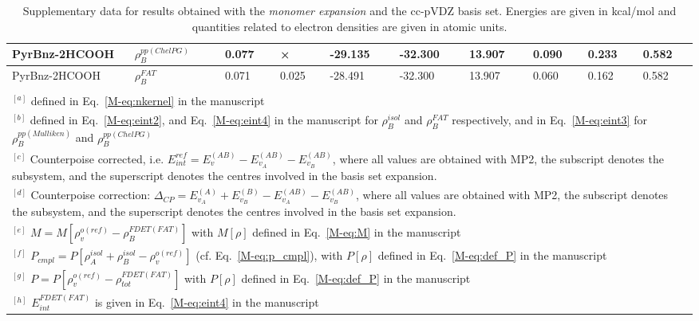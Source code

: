 \documentclass[amsmath,amssymb,preprint,aip,jcp]{revtex4-1}
\begin{document}
\begin{table}[H]
\begin{center}
{\begin{tabular}{|l|l|l|l|l|l|l|l|l|l|}
PyrBnz-2HCOOH & $\rho_B^{pp(ChelPG)}$ & 0.077 & × & -29.135 & -32.300 & 13.907 & 0.090 & 0.233 & 0.582\\\hline
PyrBnz-2HCOOH & $\rho_B^{FAT}$ & 0.071 & 0.025 & -28.491 & -32.300 & 13.907 & 0.060 & 0.162 & 0.582\\\hline
\multicolumn{10}{c}{ } \\
\multicolumn{10}{p{1.0\textwidth}}{$^{[a]}$ defined in Eq.~\ref{M-eq:nkernel} in the manuscript}\\
\multicolumn{10}{p{1.0\textwidth}}{$^{[b]}$ defined in Eq.~\ref{M-eq:eint2}, and Eq.~\ref{M-eq:eint4} in the manuscript for $\rho_B^{isol}$ and $\rho_B^{FAT }$ respectively, and in Eq.~\ref{M-eq:eint3} for $\rho_B^{pp(Mulliken)}$ and $\rho_B^{pp(ChelPG)}$}\\
\multicolumn{10}{p{1.0\textwidth}}{$^{[c]}$ Counterpoise corrected, i.e. $E_{int}^{ref} = E_{v}^{(AB)} - E_{v_A}^{(AB)} - E_{v_B}^{(AB)}$, where all values are obtained with MP2, the subscript denotes the subsystem, and the superscript denotes the centres involved in the basis set expansion.} \\
\multicolumn{10}{p{1.0\textwidth}}{$^{[d]}$ Counterpoise correction: $\Delta_{CP} = E_{v_A}^{(A)} + E_{v_B}^{(B)} - E_{v_A}^{(AB)} - E_{v_B}^{(AB)}$, where all values are obtained with MP2, the subscript denotes the subsystem, and the superscript denotes the centres involved in the basis set expansion.} \\
\multicolumn{10}{p{1.0\textwidth}}{$^{[e]}$ $M=M[\rho_v^{o(ref)} - \rho^{FDET(FAT)}_{B}]$ with $M[\rho]$ defined in Eq.~\ref{M-eq:M} in the manuscript}\\
\multicolumn{10}{p{1.0\textwidth}}{$^{[f]}$ $P_{cmpl}=P[\rho_A^{isol}+\rho_B^{isol} - \rho_v^{o(ref)}]$ (cf. Eq.~\ref{M-eq:p_cmpl}), with $P[\rho]$ defined in Eq.~\ref{M-eq:def_P} in the manuscript}\\
\multicolumn{10}{p{1.0\textwidth}}{$^{[g]}$ $P=P[\rho_v^{o(ref)} - \rho_{tot}^{FDET(FAT)}]$ with $P[\rho]$ defined in Eq.~\ref{M-eq:def_P} in the manuscript}\\
\multicolumn{10}{p{1.0\textwidth}}{$^{[h]}$ $E^{FDET(FAT)}_{int}$ is given in Eq.~\ref{M-eq:eint4} in the manuscript}\\
\end{tabular}
}
\end{center}
\caption{Supplementary data for results obtained with the \textit{monomer expansion} and the cc-pVDZ basis set. Energies are given in kcal/mol and quantities related to electron densities are given in atomic units.}
\end{table}
\end{document}
